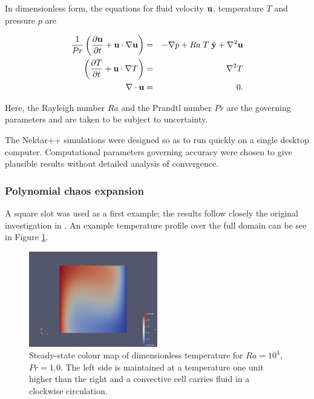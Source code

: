 In dimensionless form, the equations for fluid velocity $\bf{u}$, temperature $T$ and pressure $p$ are

\begin{eqnarray}
\frac{1}{Pr} \left ( \frac{\partial \bf u}{\partial t} + {\bf u} \cdot \nabla {\bf u} \right ) &=& - \nabla p + Ra \; T \; \hat{{\bf y}} + \nabla^2 {\bf u}\\
\left ( \frac{\partial T}{\partial t} + {\bf u} \cdot \nabla T \right ) &=& \nabla^2 T\\
\nabla \cdot {\bf u} &=& 0.
\end{eqnarray}

Here, the Rayleigh number $Ra$ and the Prandtl number $Pr$ are the governing parameters and are taken to be subject to uncertainty. 




The Nektar++ simulations were designed so as to run quickly on a single desktop computer.  
Computational parameters governing accuracy were chosen to give plausible results without detailed analysis of convergence.

\subsubsection{Polynomial chaos expansion}

A square slot was used as a first example; the results follow closely the original investigation in \cite{El65Nume}.  
An example temperature profile over the full domain can be see in Figure \ref{fig:tempfield}.

\begin{figure}[tbp]
\begin{centering}
\includegraphics[width=0.5\textwidth]{laminar.png}
\caption{\small Steady-state colour map of dimensionless temperature for $Ra=10^4$, $Pr=1.0$.  The left side is maintained at a temperature one unit higher than the right and a convective cell carries fluid in a clockwise circulation.
\label{fig:tempfield}
}
\par
\end{centering}
\end{figure}

